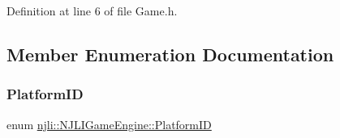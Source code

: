 Definition at line 6 of file Game.\+h.



\subsection{Member Enumeration Documentation}
\mbox{\label{classnjli_1_1_n_j_l_i_game_engine_a5a2bbb7c337d3918056ba12307f2a4ed}} 
\subsubsection{\texorpdfstring{Platform\+ID}{PlatformID}}
{\footnotesize\ttfamily enum \mbox{\hyperlink{classnjli_1_1_n_j_l_i_game_engine_a5a2bbb7c337d3918056ba12307f2a4ed}{njli\+::\+N\+J\+L\+I\+Game\+Engine\+::\+Platform\+ID}}}

